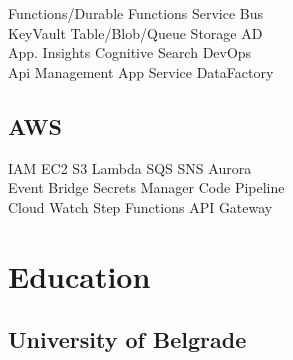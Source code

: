 \documentclass[letterpaper]{cv_12} %
\begin{document}
\begin{minipage}[t]{0.39\textwidth}
    Functions/Durable Functions \textbullet{} Service Bus\\
    KeyVault \textbullet{} Table/Blob/Queue Storage \textbullet{} AD\\
    App. Insights \textbullet{} Cognitive Search \textbullet{} DevOps\\
    Api Management \textbullet{} App Service \textbullet{} DataFactory

    \sectionspace%

    \subsection{AWS}

    IAM \textbullet{} EC2 \textbullet{} S3 \textbullet{} Lambda
    \textbullet{} SQS \textbullet{} SNS \textbullet{} Aurora\\
    Event Bridge \textbullet{} Secrets Manager \textbullet{} Code
    Pipeline\\
    Cloud Watch \textbullet{} Step Functions \textbullet{} API Gateway

    \sectionspace%


    \section{Education}

    \subsection{University of Belgrade}


    \sectionspace%


    \sectionspace%


\end{minipage} %
\end{document}
